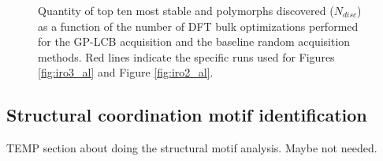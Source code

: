 

\begin{figure}[!htb]
\centering
{}
\caption{\label{fig:disc_rate}
%
Quantity of top ten most stable \IrOtwo and \IrOthree polymorphs discovered ($N_{disc}$) as a function of the number of DFT bulk optimizations performed for the GP-LCB acquisition and the baseline random acquisition methods.
%
Red lines indicate the specific runs used for Figures \ref{fig:iro3_al} and Figure \ref{fig:iro2_al}.
}
\end{figure}


\subsection{Structural coordination motif identification} %
%


%
TEMP section about doing the structural motif analysis. Maybe not needed.


